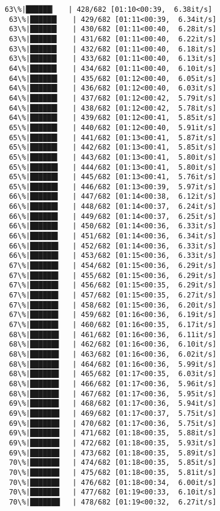 \documentclass[11pt]{article}
\begin{document}
\begin{Verbatim}[commandchars=\\\{\}]
 63\%|██████▎   | 428/682 [01:10<00:39,  6.38it/s]
 63\%|██████▎   | 429/682 [01:11<00:39,  6.34it/s]
 63\%|██████▎   | 430/682 [01:11<00:40,  6.28it/s]
 63\%|██████▎   | 431/682 [01:11<00:40,  6.22it/s]
 63\%|██████▎   | 432/682 [01:11<00:40,  6.18it/s]
 63\%|██████▎   | 433/682 [01:11<00:40,  6.13it/s]
 64\%|██████▎   | 434/682 [01:11<00:40,  6.10it/s]
 64\%|██████▍   | 435/682 [01:12<00:40,  6.05it/s]
 64\%|██████▍   | 436/682 [01:12<00:40,  6.03it/s]
 64\%|██████▍   | 437/682 [01:12<00:42,  5.79it/s]
 64\%|██████▍   | 438/682 [01:12<00:42,  5.78it/s]
 64\%|██████▍   | 439/682 [01:12<00:41,  5.85it/s]
 65\%|██████▍   | 440/682 [01:12<00:40,  5.91it/s]
 65\%|██████▍   | 441/682 [01:13<00:41,  5.87it/s]
 65\%|██████▍   | 442/682 [01:13<00:41,  5.85it/s]
 65\%|██████▍   | 443/682 [01:13<00:41,  5.80it/s]
 65\%|██████▌   | 444/682 [01:13<00:41,  5.80it/s]
 65\%|██████▌   | 445/682 [01:13<00:41,  5.76it/s]
 65\%|██████▌   | 446/682 [01:13<00:39,  5.97it/s]
 66\%|██████▌   | 447/682 [01:14<00:38,  6.12it/s]
 66\%|██████▌   | 448/682 [01:14<00:37,  6.24it/s]
 66\%|██████▌   | 449/682 [01:14<00:37,  6.25it/s]
 66\%|██████▌   | 450/682 [01:14<00:36,  6.33it/s]
 66\%|██████▌   | 451/682 [01:14<00:36,  6.34it/s]
 66\%|██████▋   | 452/682 [01:14<00:36,  6.33it/s]
 66\%|██████▋   | 453/682 [01:15<00:36,  6.33it/s]
 67\%|██████▋   | 454/682 [01:15<00:36,  6.29it/s]
 67\%|██████▋   | 455/682 [01:15<00:36,  6.29it/s]
 67\%|██████▋   | 456/682 [01:15<00:35,  6.29it/s]
 67\%|██████▋   | 457/682 [01:15<00:35,  6.27it/s]
 67\%|██████▋   | 458/682 [01:15<00:36,  6.20it/s]
 67\%|██████▋   | 459/682 [01:16<00:36,  6.19it/s]
 67\%|██████▋   | 460/682 [01:16<00:35,  6.17it/s]
 68\%|██████▊   | 461/682 [01:16<00:36,  6.11it/s]
 68\%|██████▊   | 462/682 [01:16<00:36,  6.10it/s]
 68\%|██████▊   | 463/682 [01:16<00:36,  6.02it/s]
 68\%|██████▊   | 464/682 [01:16<00:36,  5.99it/s]
 68\%|██████▊   | 465/682 [01:17<00:35,  6.03it/s]
 68\%|██████▊   | 466/682 [01:17<00:36,  5.96it/s]
 68\%|██████▊   | 467/682 [01:17<00:36,  5.95it/s]
 69\%|██████▊   | 468/682 [01:17<00:36,  5.94it/s]
 69\%|██████▉   | 469/682 [01:17<00:37,  5.75it/s]
 69\%|██████▉   | 470/682 [01:17<00:36,  5.75it/s]
 69\%|██████▉   | 471/682 [01:18<00:35,  5.88it/s]
 69\%|██████▉   | 472/682 [01:18<00:35,  5.93it/s]
 69\%|██████▉   | 473/682 [01:18<00:35,  5.89it/s]
 70\%|██████▉   | 474/682 [01:18<00:35,  5.85it/s]
 70\%|██████▉   | 475/682 [01:18<00:35,  5.81it/s]
 70\%|██████▉   | 476/682 [01:18<00:34,  6.00it/s]
 70\%|██████▉   | 477/682 [01:19<00:33,  6.10it/s]
 70\%|███████   | 478/682 [01:19<00:32,  6.27it/s]

\end{Verbatim}
\end{document}
